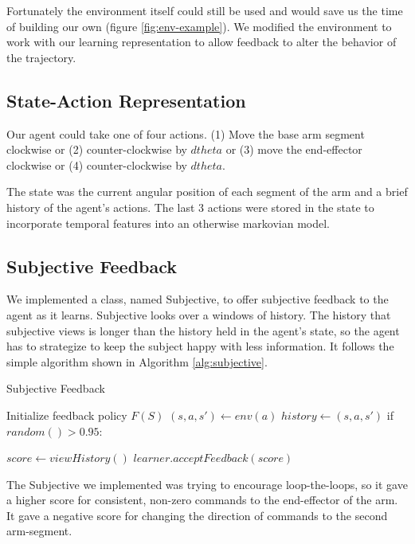 \documentclass{article}
\newlength\myindent
\newcommand\bindent{%
  \begingroup
  \setlength{\itemindent}{\myindent}
  \addtolength{\algorithmicindent}{\myindent}
}
\newcommand\eindent{\endgroup}
\begin{document}
Fortunately the environment itself could still be used and would save us the time of building our own (figure \ref{fig:env-example}). We modified the environment to work with our learning representation to allow feedback to alter the behavior of the trajectory. 

\subsection{State-Action Representation}

Our agent could take one of four actions. (1) Move the base arm segment clockwise or (2) counter-clockwise by $dtheta$ or (3) move the end-effector clockwise or (4) counter-clockwise by $dtheta$.

The state was the current angular position of each segment of the arm and a brief history of the agent's actions. The last 3 actions were stored in the state to incorporate temporal features into an otherwise markovian model.

\subsection{Subjective Feedback}

We implemented a class, named Subjective, to offer subjective feedback to the agent as it learns. Subjective looks over a windows of history. The history that subjective views is longer than the history held in the agent's state, so the agent has to strategize to keep the subject happy with less information. It follows the simple algorithm shown in Algorithm \ref{alg:subjective}.

\begin{algorithm}
  \caption{Subjective Feedback} \label{alg:subjective}
  \begin{algorithmic}
    \STATE Initialize feedback policy $F(S)$
      \STATE $(s,a,s') \leftarrow env(a)$
      \STATE $history \leftarrow (s,a,s')$
      \STATE if $random() > 0.95$:
      \bindent
        \STATE $score \leftarrow viewHistory()$
        \STATE $learner.acceptFeedback(score)$
      \eindent
     \ENDWHILE
  \end{algorithmic}
\end{algorithm} 

The Subjective we implemented was trying to encourage loop-the-loops, so it gave a higher score for consistent, non-zero commands to the end-effector of the arm. It gave a negative score for changing the direction of commands to the second arm-segment.
\end{document}
